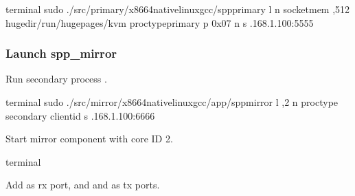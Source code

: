 \documentclass[a4paper,11pt,openany,oneside,english]{sphinxmanual}
\begin{document}
\begin{sphinxVerbatim}[commandchars=\\\{\},formatcom=\footnotesize]
 terminal 
 sudo ./src/primary/x86\PYGZus{}64\PYGZhy{}native\PYGZhy{}linux\PYGZhy{}gcc/spp\PYGZus{}primary 
    \PYGZhy{}l  \PYGZhy{}n  
    \PYGZhy{}\PYGZhy{}socket\PYGZhy{}mem ,512 
    \PYGZhy{}\PYGZhy{}huge\PYGZhy{}dir/run/hugepages/kvm 
    \PYGZhy{}\PYGZhy{}proc\PYGZhy{}typeprimary 
    \PYGZhy{}\PYGZhy{} 
    \PYGZhy{}p 0x07 \PYGZhy{}n  \PYGZhy{}s .168.1.100:5555
\end{sphinxVerbatim}


\subsubsection{Launch spp\_mirror}
\label{\detokenize{usecases/spp_mirror:launch-spp-mirror}}
Run secondary process .

\begin{sphinxVerbatim}[commandchars=\\\{\},formatcom=\footnotesize]
 terminal 
 sudo ./src/mirror/x86\PYGZus{}64\PYGZhy{}native\PYGZhy{}linux\PYGZhy{}gcc/app/spp\PYGZus{}mirror 
 \PYGZhy{}l ,2 \PYGZhy{}n  
 \PYGZhy{}\PYGZhy{}proc\PYGZhy{}type secondary 
 \PYGZhy{}\PYGZhy{} 
 \PYGZhy{}\PYGZhy{}client\PYGZhy{}id  
 \PYGZhy{}s .168.1.100:6666 
\end{sphinxVerbatim}

Start mirror component with core ID 2.

\begin{sphinxVerbatim}[commandchars=\\\{\},formatcom=\footnotesize]
 terminal 
\end{sphinxVerbatim}

Add  as rx port, and  and  as tx ports.
\end{document}
